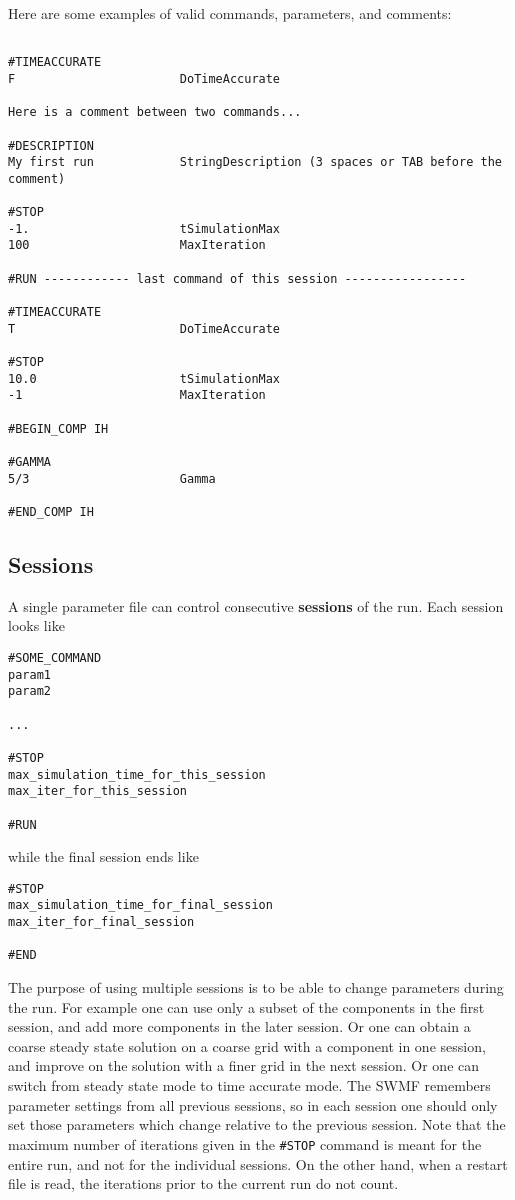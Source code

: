 Here are some examples of valid commands, parameters, and comments:
\begin{verbatim}

#TIMEACCURATE
F                       DoTimeAccurate

Here is a comment between two commands...

#DESCRIPTION
My first run            StringDescription (3 spaces or TAB before the comment)

#STOP
-1.                     tSimulationMax
100                     MaxIteration

#RUN ------------ last command of this session -----------------

#TIMEACCURATE
T                       DoTimeAccurate

#STOP
10.0                    tSimulationMax
-1                      MaxIteration

#BEGIN_COMP IH

#GAMMA
5/3                     Gamma

#END_COMP IH

\end{verbatim}

\subsection{Sessions \label{section:sessions}}

A single parameter file can control consecutive {\bf sessions}
of the run. Each session looks like
\begin{verbatim}
#SOME_COMMAND
param1
param2

...

#STOP
max_simulation_time_for_this_session
max_iter_for_this_session

#RUN
\end{verbatim}
while the final session ends like
\begin{verbatim}
#STOP
max_simulation_time_for_final_session
max_iter_for_final_session

#END
\end{verbatim}
The purpose of using multiple sessions is to be able to change parameters 
during the run. For example one can use only a subset of the
components in the first session, and add more components in the
later session. Or one can obtain a coarse steady state solution
on a coarse grid with a component in one session, and improve on the solution
with a finer grid in the next session. Or one can switch from 
steady state mode to time accurate mode. The SWMF remembers parameter
settings from all previous sessions, so in each session one should only
set those parameters which change relative to the previous session.
Note that the maximum number of iterations given in the {\tt \#STOP} command 
is meant for the entire run, and not for the individual sessions. 
On the other hand, when a restart file is read, the iterations prior to 
the current run do not count.

